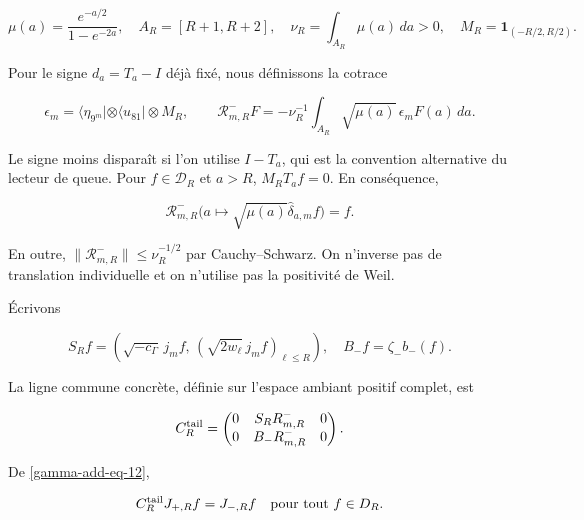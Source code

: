 \begin{equation}
\mu(a)=\frac{e^{-a/2}}{1-e^{-2a}},\quad
A_R=[R+1,R+2],\quad \nu_R=\int_{A_R}\mu(a)\,da>0,
\quad M_R=\mathbf1_{(-R/2,R/2)}.
\label{gamma-add-display-25}
\end{equation}

Pour le signe \(d_a=T_a-I\) déjà fixé, nous définissons la cotrace

\begin{equation}
\epsilon_m=\langle\eta_{9^m}|\otimes\langle u_{81}|\otimes M_R,
\qquad
\mathcal R^-_{m,R}F
=-\nu_R^{-1}\int_{A_R}\sqrt{\mu(a)}\,\epsilon_m F(a)\,da.
\label{gamma-add-eq-11}
\end{equation}

Le signe moins disparaît si l'on utilise \(I-T_a\), qui est la convention alternative du lecteur de queue. Pour \(f\in\mathcal D_R\) et \(a>R\), \(M_RT_af=0\). En conséquence,

\begin{equation}
\mathcal R^-_{m,R}
\bigl(a\mapsto\sqrt{\mu(a)}\widehat\delta_{a,m}f\bigr)=f.
\label{gamma-add-eq-12}
\end{equation}
\label{gamma-add:cola-lector}

En outre, \(\|\mathcal R^-_{m,R}\|\le\nu_R^{-1/2}\) par Cauchy--Schwarz. On n'inverse pas de translation individuelle et on n'utilise pas la positivité de Weil.

Écrivons

\begin{equation}
S_Rf=\left(\sqrt{-c_\Gamma}\,j_mf,\,
              (\sqrt{2w_\ell}\,j_mf)_{\ell\le R}\right),
\quad B_-f=\zeta_-b_-(f).
\label{gamma-add-display-28}
\end{equation}

La ligne commune concrète, définie sur l'espace ambiant positif complet, est

\begin{equation}
\mathcal C_R^{\rm tail}
=
\begin{pmatrix}
0&S_R\mathcal R^-_{m,R}&0\\
0&B_-\mathcal R^-_{m,R}&0
\end{pmatrix}.
\label{gamma-add-eq-13}
\end{equation}

De \eqref{gamma-add-eq-12},

\begin{equation}
\mathcal C_R^{\rm tail}J_{+,R}f=J_{-,R}f
\quad\hbox{pour tout }f\in\mathcal D_R.
\label{gamma-add-eq-14}
\end{equation}

